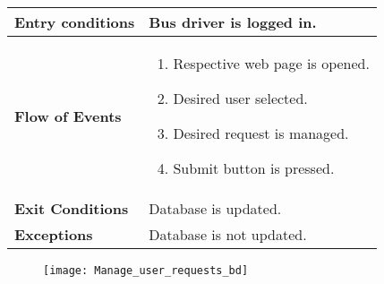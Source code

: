 \begin{itemize}
\begin{table}[H]
\begin{tabular}{| m{3.5cm} | m{9.5cm} |}
			\hline
			\textbf{Entry conditions} & Bus driver is logged in.\\
			\hline
			\textbf{Flow of Events} & 
			\begin{enumerate}
				\item Respective web page is opened. 
				\item Desired user selected. 
				\item Desired request is managed. 
				\item Submit button is pressed.
			\end{enumerate}\\
			\hline
			\textbf{Exit Conditions} & Database is updated.\\
			\hline
			\textbf{Exceptions} & Database is not updated.\\
			\hline
		\end{tabular}
	\end{table}
\begin{figure}[H]
	\centering
	\texttt{[image: Manage\_user\_requests\_bd]}
\end{figure}
\end{itemize}
\newpage
